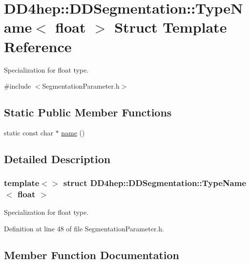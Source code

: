 \hypertarget{struct_d_d4hep_1_1_d_d_segmentation_1_1_type_name_3_01float_01_4}{}\section{D\+D4hep\+:\+:D\+D\+Segmentation\+:\+:Type\+Name$<$ float $>$ Struct Template Reference}
\label{struct_d_d4hep_1_1_d_d_segmentation_1_1_type_name_3_01float_01_4}


Specialization for float type.  




{\ttfamily \#include $<$Segmentation\+Parameter.\+h$>$}

\subsection*{Static Public Member Functions}
\begin{DoxyCompactItemize}
\item 
static const char $\ast$ \hyperlink{struct_d_d4hep_1_1_d_d_segmentation_1_1_type_name_3_01float_01_4_a5c6ce68f57f308f5ec658c5f6354671f}{name} ()
\end{DoxyCompactItemize}


\subsection{Detailed Description}
\subsubsection*{template$<$$>$\newline
struct D\+D4hep\+::\+D\+D\+Segmentation\+::\+Type\+Name$<$ float $>$}

Specialization for float type. 

Definition at line 48 of file Segmentation\+Parameter.\+h.



\subsection{Member Function Documentation}
\hypertarget{struct_d_d4hep_1_1_d_d_segmentation_1_1_type_name_3_01float_01_4_a5c6ce68f57f308f5ec658c5f6354671f}{}\label{struct_d_d4hep_1_1_d_d_segmentation_1_1_type_name_3_01float_01_4_a5c6ce68f57f308f5ec658c5f6354671f} 

